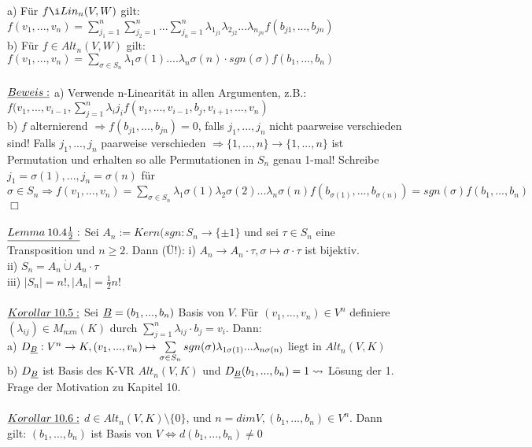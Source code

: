 \documentclass[fleqn, a4paper, 11pt]{scrartcl}
\theoremstyle{definition}
\begin{document}
a) Für $f\i Lin_n(V,W)$ gilt: $f(v_1,...,v_n)=\sum\limits_{j_1 =1}^n \sum\limits_{j_2 =1}^n ... \sum\limits_{j_n =1}^n \lambda_{1_{j1}}\lambda_{2_{j2}}...\lambda_{n_{jn}}f(b_{j1},...,b_{jn})$\\
b) Für $f\in Alt_n(V,W)$ gilt: $f(v_1,...,v_n)=\sum\limits_{\sigma\in S_n}\lambda_1 \sigma(1)....\lambda_n\sigma(n)\cdot sgn(\sigma)f(b_1,...,b_n)$\\
\\
$\uline{Beweis:}$ a) Verwende n-Linearität in allen Argumenten, z.B.: $f(v_1,...,v_{i-1},\sum\limits_{j=1}^n \lambda_i j_i f(v_1,...,v_{i-1},b_j,v_{i+1},...,v_n)$\\
b) $f$ alternierend $\Rightarrow f(b_{j1},...,b_{jn})=0$, falls $j_1,...,j_n$ nicht paarweise verschieden sind! Falls $j_1,...,j_n$ paarweise verschieden $\Rightarrow \{1,...,n\}\rightarrow\{1,...,n\}$ ist Permutation und erhalten so alle Permutationen in $S_n$ genau 1-mal! Schreibe $j_1=\sigma(1),...,j_n=\sigma(n)$ für $\sigma\in S_n\Rightarrow f(v_1,...,v_n)=\sum\limits_{\sigma\in S_n} \lambda_1 \sigma(1)\lambda_2\sigma(2)...\lambda_n\sigma(n)f(b_{\sigma(1)},...,b_{\sigma(n)})=sgn(\sigma)f(b_1,...,b_n)$ \hfill $\Box$\\
\\
$\uline{Lemma\:10.4\tfrac{1}{2}:}$ Sei $A_n:=Kern(sgn:S_n\rightarrow\{\pm 1\}$ und sei $\tau\in S_n$ eine Transposition und $n\geq 2$. Dann (\"U!): i) $A_n\rightarrow A_n\cdot\tau,\sigma\mapsto\sigma\cdot\tau$ ist bijektiv.\\
ii) $S_n=A_n\mathbin{\dot{\cup}} A_n\cdot\tau$\\
iii) $|S_n|=n!,|A_n|=\tfrac{1}{2} n!$\\
\\
$\uline{Korollar\:10.5:}$ Sei $\uline{B}=(b_1,...,b_n)$ Basis von $V$. Für $(v_1,...,v_n)\in V^n$ definiere $(\lambda_{ij})\in M_{nxn}(K)$ durch $\sum\limits_{j=1}^n \lambda_{ij}\cdot b_j=v_i$. Dann:\\
a) $D_{\uline{B}}:V^n\rightarrow K,(v_1,...,v_n)\mapsto\sum\limits_{\sigma\in S_n} sgn(\sigma)\lambda_{1\sigma(1)}...\lambda_{n\sigma(n)}$ liegt in $Alt_n(V,K)$\\
b) $D_{\uline{B}}$ ist Basis des K-VR $Alt_n(V,K)$ und $D_{\uline{B}}(b_1,...,b_n)=1\leadsto$ Lösung der 1. Frage der Motivation zu Kapitel 10.\\
\\
$\uline{Korollar\:10.6:}$ $d\in Alt_n(V,K)\setminus\{0\}$, und $n=dim V,(b_1,...,b_n)\in V^n$. Dann gilt: $(b_1,...,b_n)$ ist Basis von $V\Leftrightarrow d(b_1,...,b_n)\neq 0$\\
\end{document}
